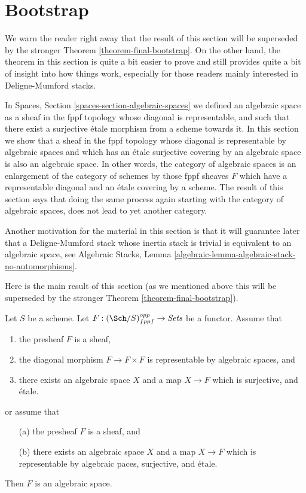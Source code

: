 \section{Bootstrap}
\label{section-bootstrap}

\noindent
We warn the reader right away that the result of this section will
be superseded by the stronger
Theorem \ref{theorem-final-bootstrap}.
On the other hand, the theorem in this section is quite a bit easier to
prove and still provides quite a bit of insight into how things work,
especially for those readers mainly interested in Deligne-Mumford
stacks.

\medskip\noindent
In
Spaces, Section \ref{spaces-section-algebraic-spaces}
we defined an algebraic space as a sheaf in the fppf topology whose
diagonal is representable, and such that there exist a surjective \'etale
morphism from a scheme towards it. In this section we show that
a sheaf in the fppf topology whose diagonal is representable by algebraic
spaces and which has an \'etale surjective covering by an algebraic space
is also an algebraic space.
In other words, the category of algebraic spaces is an enlargement of the
category of schemes by those fppf sheaves $F$ which have a representable
diagonal and an \'etale covering by a scheme. The
result of this section says that doing the same process again starting with
the category of algebraic spaces, does not lead to yet another category.

\medskip\noindent
Another motivation for the material in this section is that it will guarantee
later that a Deligne-Mumford stack whose inertia stack is trivial is equivalent
to an algebraic space, see
Algebraic Stacks, Lemma \ref{algebraic-lemma-algebraic-stack-no-automorphisms}.

\medskip\noindent
Here is the main result of this section (as we mentioned above this
will be superseded by the stronger
Theorem \ref{theorem-final-bootstrap}).

\begin{theorem}
\label{theorem-bootstrap}
Let $S$ be a scheme.
Let $F : (\Sch/S)_{fppf}^{opp} \to \textit{Sets}$ be a functor.
Assume that
\begin{enumerate}
\item the presheaf $F$ is a sheaf,
\item the diagonal morphism $F  \to F \times F$ is representable by
algebraic spaces, and
\item there exists an algebraic space $X$
and a map $X \to F$ which is surjective, and \'etale.
\end{enumerate}
or assume that
\begin{enumerate}
\item[(a)] the presheaf $F$ is a sheaf, and
\item[(b)] there exists an algebraic space $X$ and a map $X \to F$
which is representable by algebraic paces, surjective, and \'etale.
\end{enumerate}
Then $F$ is an algebraic space.
\end{theorem}

